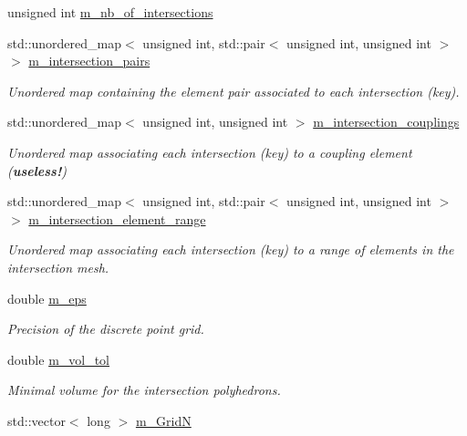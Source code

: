 \begin{DoxyCompactItemize}
unsigned int \hyperlink{classcarl_1_1_mesh___intersection_a60ae2905b3c3debe5194811e176826ce}{m\+\_\+nb\+\_\+of\+\_\+intersections}
\item 
std\+::unordered\+\_\+map$<$ unsigned int, std\+::pair$<$ unsigned int, unsigned int $>$ $>$ \hyperlink{classcarl_1_1_mesh___intersection_a06a4d0d633bf58594fee6e35ebbc1b97}{m\+\_\+intersection\+\_\+pairs}
\begin{DoxyCompactList}\small\item\em Unordered map containing the element pair associated to each intersection (key). \end{DoxyCompactList}\item 
std\+::unordered\+\_\+map$<$ unsigned int, unsigned int $>$ \hyperlink{classcarl_1_1_mesh___intersection_ab0d6f92956f02022cfdfb2e3b84e1676}{m\+\_\+intersection\+\_\+couplings}
\begin{DoxyCompactList}\small\item\em Unordered map associating each intersection (key) to a coupling element ({\bfseries useless!}) \end{DoxyCompactList}\item 
std\+::unordered\+\_\+map$<$ unsigned int, std\+::pair$<$ unsigned int, unsigned int $>$ $>$ \hyperlink{classcarl_1_1_mesh___intersection_adcbc0fb898aa287c2ff2a13693daf572}{m\+\_\+intersection\+\_\+element\+\_\+range}
\begin{DoxyCompactList}\small\item\em Unordered map associating each intersection (key) to a range of elements in the intersection mesh. \end{DoxyCompactList}\item 
double \hyperlink{classcarl_1_1_mesh___intersection_a2b2a46afcfa01b2763315f439bd0a4d6}{m\+\_\+eps}
\begin{DoxyCompactList}\small\item\em Precision of the discrete point grid. \end{DoxyCompactList}\item 
double \hyperlink{classcarl_1_1_mesh___intersection_ad282e724c75087a90026854992ec0809}{m\+\_\+vol\+\_\+tol}
\begin{DoxyCompactList}\small\item\em Minimal volume for the intersection polyhedrons. \end{DoxyCompactList}\item 
std\+::vector$<$ long $>$ \hyperlink{classcarl_1_1_mesh___intersection_a74b7064e400e0dbf8c62eb7efef1b784}{m\+\_\+\+Grid\+N}

\end{DoxyCompactItemize}
